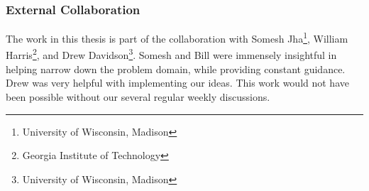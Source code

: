 \subsubsection{External Collaboration}
The work in this thesis is part of the collaboration with Somesh Jha\footnote{University of Wisconsin, Madison}, William Harris\footnote{Georgia Institute of Technology}, and Drew Davidson\footnote{University of Wisconsin, Madison}. Somesh and Bill were immensely insightful in helping narrow down the problem domain, while providing constant guidance. Drew was very helpful with implementing our ideas. This work would not have been possible without our several regular weekly discussions.
